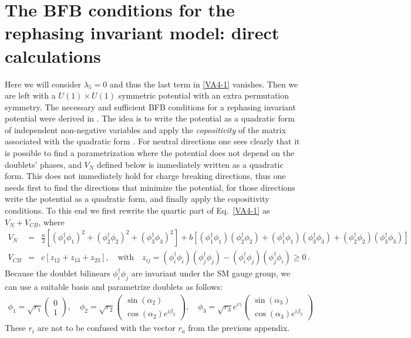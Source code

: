 \documentclass[11pt]{article}
\newcommand{\doublet}[2]{ \left( \begin{array}{c}#1 \\ #2 \end{array}\right) }
\begin{document}

\section{The BFB conditions for the rephasing invariant model: direct calculations}\label{appendix:checks}

Here we will consider $\lambda_5=0$ and thus the last term in \eqref{VA4-1} vanishes. Then we are left with a $U(1)\times U(1)$ symmetric potential with an extra permutation symmetry. The necessary and sufficient BFB conditions for a rephasing invariant potential were derived in \cite{Faro:2019vcd}. The idea is to write the potential as a quadratic form of independent non-negative variables and apply the \textit{copositivity} of the matrix associated with the quadratic form \cite{Kannike:2012pe}. For neutral directions one sees clearly that it is possible to find a parametrization where the potential does not depend on the doublets' phases, and $V_N$ defined below is immediately written as a quadratic form. 
This does not immediately hold for charge breaking directions, thus one needs first to find the directions that minimize the potential, for those directions write the potential as a quadratic form, and finally apply the copositivity conditions.
To this end we first rewrite the quartic part of Eq.~\eqref{VA4-1} as $V_N + V_{CB}$, where
\begin{eqnarray}
    V_N &=& \frac{a}{2}\left[(\phi_1^\dagger\phi_1)^2 + (\phi_2^\dagger\phi_2)^2 + (\phi_3^\dagger\phi_3)^2\right] + b\left[(\phi_1^\dagger\phi_1)(\phi_2^\dagger\phi_2) + (\phi_1^\dagger\phi_1)(\phi_3^\dagger\phi_3)+ (\phi_2^\dagger\phi_2)(\phi_3^\dagger\phi_3)\right]\nonumber\\
    V_{CB} &=& c\left[z_{12} + z_{13}+z_{23}\right], \quad \textrm{with} \quad z_{ij} = (\phi_i^\dagger\phi_i)(\phi_j^\dagger\phi_j) - (\phi_i^\dagger\phi_j)(\phi_j^\dagger\phi_i) \geq 0\,.
    \label{CB_part}
\end{eqnarray}
Because the doublet bilinears $\phi_i^\dagger \phi_j$ are invariant under the SM gauge group, 
we can use a suitable basis and parametrize doublets as follows:
\begin{eqnarray}
\phi_1= \sqrt{r_1}\doublet{0}{1}, \quad 
\phi_2= \sqrt{r_2}\doublet{\sin{(\alpha_2)}}{\cos{(\alpha_2)}e^{i\beta_2}}, \quad
\phi_3= \sqrt{r_3}e^{i\gamma}\doublet{\sin{(\alpha_3)}}{\cos{(\alpha_3)}e^{i\beta_3}}
\label{eq:doublet_par}
\end{eqnarray}
These $r_i$ are not to be confused with the vector $r_a$ from the previous appendix.
\end{document}
